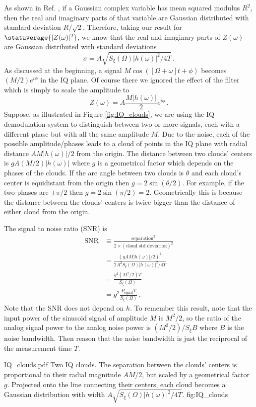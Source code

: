 As shown in Ref. \cite{Sank:whiteNoiseDFT}, if a Gaussian complex variable has mean squared modulus $R^2$, then the real and imaginary parts of that variable are Gaussian distributed with standard deviation $R / \sqrt{2}$.
Therefore, taking our result for $\stataverage{|Z(\omega)|^2}$, we know that the real and imaginary parts of $Z(\omega)$ are Gaussian distributed with standard deviations
\begin{equation}
\sigma = A \sqrt{S_\xi(\Omega) |h(\omega)|^2 / 4 T} \, .
\end{equation}
As discussed at the beginning, a signal $M \cos([\Omega + \omega] t + \phi)$ becomes $(M/2)e^{i \phi}$ in the IQ plane.
Of course there we ignored the effect of the filter which is simply to scale the amplitude to
\begin{equation}
Z(\omega) = A \frac{M |h(\omega)|}{2} e^{i \phi} \, .
\end{equation}
Suppose, as illustrated in Figure \ref{fig:IQ_clouds}, we are using the IQ demodulation system to distinguish between two or more signals, each with a different phase but with all the same amplitude $M$.
Due to the noise, each of the possible amplitude/phases leads to a cloud of points in the IQ plane with radial distance $A M |h(\omega)|/2$ from the origin.
The distance between two clouds' centers is $g A (M/2)|h(\omega)|$ where $g$ is a geometrical factor which depends on the phases of the clouds.
If the arc angle between two clouds is $\theta$ and each cloud's center is equidistant from the origin then $g = 2 \sin(\theta / 2)$.
For example, if the two phases are $\pm\pi/2$ then $g=2 \sin(\pi/2) = 2$.
Geometrically this is because the distance between the clouds' centers is twice bigger than the distance of either cloud from the origin.

The signal to noise ratio (SNR) is
\begin{align}
\text{SNR}
& \equiv \frac{\text{separation}^2}{2 \times (\text{cloud std deviation})^2} \\
&= \frac{(g A M |h(\omega)|/2)^2}{2 A^2 S_\xi(\Omega) |h(\omega)|^2 / 4T} \\
&= \frac{g^2 (M^2/2) T}{S_\xi(\Omega)} \\
&= g^2 \frac{P_\text{signal} T}{S_\xi(\Omega)}
\, .
\end{align}
Note that the SNR does not depend on $h$.
To remember this result, note that the input power of the sinusoid signal of amplitude $M$ is $M^2/2$, so the ratio of the analog signal power to the analog noise power is $(M^2 / 2) / S_\xi B$ where $B$ is the noise bandwidth.
Then reason that the noise bandwidth is just the reciprocal of the measurement time $T$.

{IQ_clouds.pdf}
{Two IQ clouds. The separation between the clouds' centers is proportional to their radial magnitude $A M/2$, but scaled by a geometrical factor $g$. Projected onto the line connecting their centers, each cloud becomes a Gaussian distribution with width $A \sqrt{S_\xi(\Omega)|h(\omega)|^2/4T}$.}
{fig:IQ_clouds}

